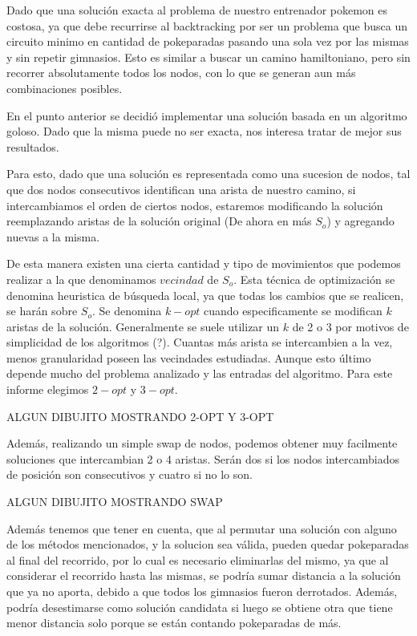 Dado que una solución exacta al problema de nuestro entrenador pokemon es costosa, ya que debe recurrirse al backtracking por ser un problema que busca un circuito minimo en cantidad de pokeparadas pasando una sola vez por las mismas y sin repetir gimnasios. Esto es similar a buscar un camino hamiltoniano, pero sin recorrer absolutamente todos los nodos, con lo que se generan aun más combinaciones posibles.

En el punto anterior se decidió implementar una solución basada en un algoritmo goloso. Dado que la misma puede no ser exacta, nos interesa tratar de mejor sus resultados. 


Para esto, dado que una solución es representada como una sucesion de nodos, tal que dos nodos consecutivos identifican una arista de nuestro camino, si intercambiamos el orden de ciertos nodos, estaremos modificando la solución reemplazando aristas de la solución original (De ahora en más $S_o$) y agregando nuevas a la misma. 

De esta manera existen una cierta cantidad y tipo de movimientos que podemos realizar a la que denominamos $vecindad$ de $S_o$. Esta técnica de optimización se denomina heuristica de búsqueda local, ya que todas los cambios que se realicen, se harán sobre $S_o$. 
Se denomina $k-opt$ cuando especificamente se modifican $k$ aristas de la solución. Generalmente se suele utilizar un $k$ de 2 o 3 por motivos de simplicidad de los algoritmos (?). Cuantas más arista se intercambien a la vez, menos granularidad poseen las vecindades estudiadas. Aunque esto último depende mucho del problema analizado y las entradas del algoritmo. Para este informe elegimos $2-opt$ y $3-opt$.

ALGUN DIBUJITO MOSTRANDO 2-OPT Y 3-OPT 

Además, realizando un simple swap de nodos, podemos obtener muy facilmente soluciones que intercambian 2 o 4 aristas. Serán dos si los nodos intercambiados de posición son consecutivos y cuatro si no lo son.

ALGUN DIBUJITO MOSTRANDO SWAP

Además tenemos que tener en cuenta, que al permutar una solución con alguno de los métodos mencionados, y la solucion sea válida, pueden quedar pokeparadas al final del recorrido, por lo cual es necesario eliminarlas del mismo, ya que al considerar el recorrido hasta las mismas, se podría sumar distancia a la solución que ya no aporta, debido a que todos los gimnasios fueron derrotados. Además,   podría desestimarse como solución candidata si luego se obtiene otra que tiene menor distancia solo porque se están contando pokeparadas de más.\\

